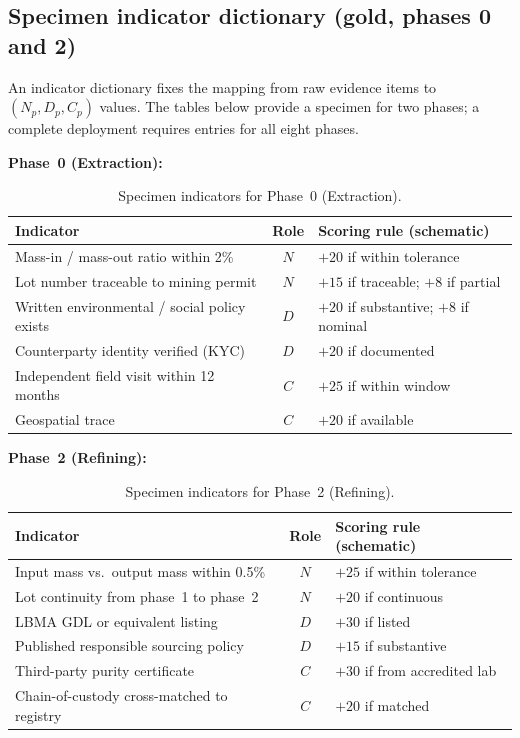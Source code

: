 \documentclass[12pt]{article}
\theoremstyle{remark}
\begin{document}
\subsection{Specimen indicator dictionary (gold, phases 0 and 2)}

An indicator dictionary fixes the mapping from raw evidence items to $(N_p, D_p, C_p)$
values.  The tables below provide a specimen for two phases; a complete deployment
requires entries for all eight phases.

\textbf{Phase~0 (Extraction):}

\begin{table}[ht]
\centering
\caption{Specimen indicators for Phase~0 (Extraction).\label{tab:dict-p0}}
\renewcommand{\arraystretch}{1.15}
\begin{tabular}{>{\raggedright\arraybackslash}p{6.5cm} c >{\raggedright\arraybackslash}p{5cm}}
\toprule
Indicator & Role & Scoring rule (schematic) \\
\midrule
Mass-in / mass-out ratio within 2\% & $N$ & $+20$ if within tolerance \\
Lot number traceable to mining permit & $N$ & $+15$ if traceable; $+8$ if partial \\
Written environmental / social policy exists & $D$ & $+20$ if substantive; $+8$ if nominal \\
Counterparty identity verified (KYC) & $D$ & $+20$ if documented \\
Independent field visit within 12 months & $C$ & $+25$ if within window \\
Geospatial trace & $C$ & $+20$ if available \\\bottomrule
\end{tabular}
\end{table}

\textbf{Phase~2 (Refining):}

\begin{table}[ht]
\centering
\caption{Specimen indicators for Phase~2 (Refining).\label{tab:dict-p2}}
\renewcommand{\arraystretch}{1.15}
\begin{tabular}{>{\raggedright\arraybackslash}p{6.5cm} c >{\raggedright\arraybackslash}p{5cm}}
\toprule
Indicator & Role & Scoring rule (schematic) \\
\midrule
Input mass vs.\ output mass within 0.5\% & $N$ & $+25$ if within tolerance \\
Lot continuity from phase~1 to phase~2 & $N$ & $+20$ if continuous \\
LBMA GDL or equivalent listing \cite{LBMA2021} & $D$ & $+30$ if listed \\
Published responsible sourcing policy & $D$ & $+15$ if substantive \\
Third-party purity certificate & $C$ & $+30$ if from accredited lab \\
Chain-of-custody cross-matched to registry & $C$ & $+20$ if matched \\\bottomrule
\end{tabular}
\end{table}
\end{document}
